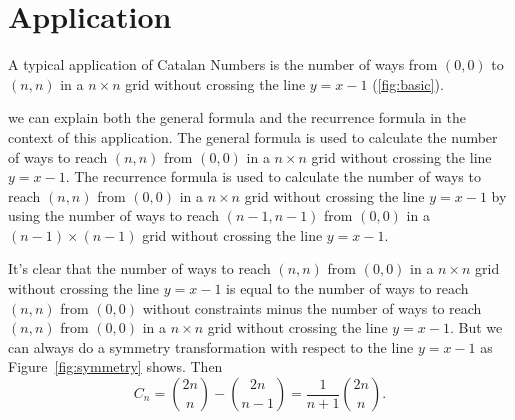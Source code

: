 \section{Application}

A typical application of Catalan Numbers is the number of ways from $(0, 0)$ to $(n, n)$ in a $n \times n$ grid without crossing the line $y = x-1$ (\ref*{fig:basic}).

we can explain both the general formula and the recurrence formula in the context of this application. The general formula is used to calculate the number of ways to reach $(n, n)$ from $(0, 0)$ in a $n \times n$ grid without crossing the line $y = x-1$. The recurrence formula is used to calculate the number of ways to reach $(n, n)$ from $(0, 0)$ in a $n \times n$ grid without crossing the line $y = x-1$ by using the number of ways to reach $(n-1, n-1)$ from $(0, 0)$ in a $(n-1) \times (n-1)$ grid without crossing the line $y = x-1$.

It's clear that the number of ways to reach $(n, n)$ from $(0, 0)$ in a $n \times n$ grid without crossing the line $y = x-1$ is equal to the number of ways to reach $(n, n)$ from $(0, 0)$ without constraints minus the number of ways to reach $(n, n)$ from $(0, 0)$ in a $n \times n$ grid without crossing the line $y = x-1$. 
But we can always do a symmetry transformation with respect to the line $y = x-1$ as Figure~\ref{fig:symmetry} shows. Then
\[
    C_n = \binom{2n}{n} - \binom{2n}{n-1} = \frac{1}{n+1}\binom{2n}{n}.
\]

